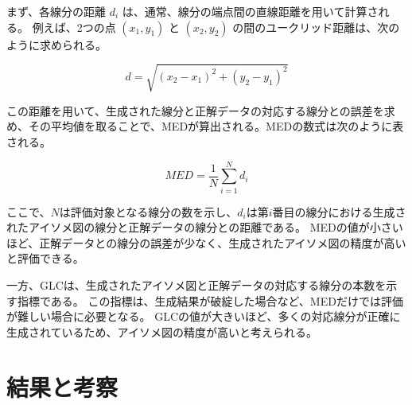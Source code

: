 まず、各線分の距離 $d_i$ は、通常、線分の端点間の直線距離を用いて計算される。
例えば、2つの点 $(x_1, y_1)$ と $(x_2, y_2)$ の間のユークリッド距離は、次のように求められる。

\[
d = \sqrt{(x_2 - x_1)^2 + (y_2 - y_1)^2}
\]

この距離を用いて、生成された線分と正解データの対応する線分との誤差を求め、その平均値を取ることで、MEDが算出される。MEDの数式は次のように表される。

\[
MED = \frac{1}{N} \sum_{i=1}^{N} d_i
\]

ここで、$N$は評価対象となる線分の数を示し、$d_i$は第$i$番目の線分における生成されたアイソメ図の線分と正解データの線分との距離である。
MEDの値が小さいほど、正解データとの線分の誤差が少なく、生成されたアイソメ図の精度が高いと評価できる。

一方、GLCは、生成されたアイソメ図と正解データの対応する線分の本数を示す指標である。
この指標は、生成結果が破綻した場合など、MEDだけでは評価が難しい場合に必要となる。
GLCの値が大きいほど、多くの対応線分が正確に生成されているため、アイソメ図の精度が高いと考えられる。


\section{結果と考察}





